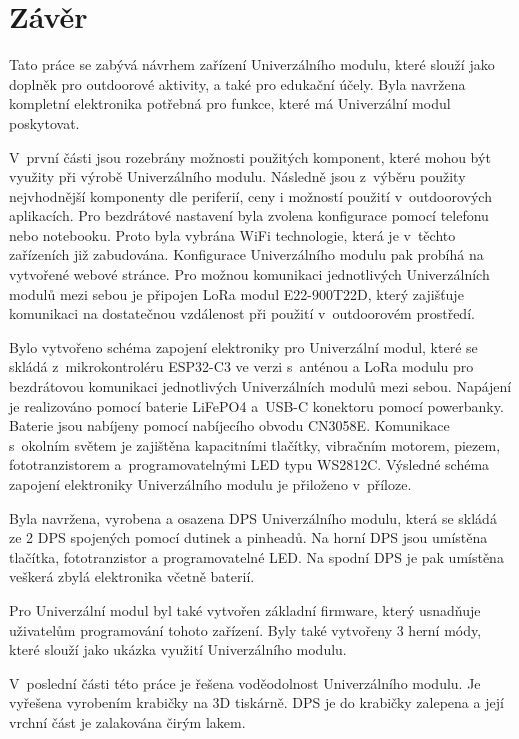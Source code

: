 \chapter*{Závěr}
{}
Tato práce se zabývá návrhem zařízení Univerzálního modulu, které slouží jako doplněk pro outdoorové aktivity, a také pro edukační účely. Byla navržena kompletní 
elektronika potřebná pro funkce, které má Univerzální modul poskytovat. 

V~první části jsou rozebrány možnosti použitých komponent, které mohou být využity při výrobě Univerzálního modulu. Následně jsou z~výběru použity 
nejvhodnější komponenty dle periferií, ceny i možností použití v~outdoorových aplikacích. Pro bezdrátové nastavení byla zvolena konfigurace pomocí telefonu nebo 
notebooku. Proto byla vybrána WiFi technologie, která je v~těchto zařízeních již zabudována. Konfigurace Univerzálního modulu pak probíhá na vytvořené webové stránce. 
Pro možnou komunikaci jednotlivých Univerzálních modulů mezi sebou je připojen LoRa modul E22-900T22D, který zajišťuje komunikaci na dostatečnou vzdálenost při použití 
v~outdoorovém prostředí. 

Bylo vytvořeno schéma zapojení elektroniky pro Univerzální modul, které se skládá z~mikrokontroléru ESP32-C3 ve verzi s~anténou a LoRa modulu pro 
bezdrátovou komunikaci jednotlivých Univerzálních modulů mezi sebou. Napájení je realizováno pomocí baterie LiFePO4 a~USB-C konektoru pomocí powerbanky. Baterie 
jsou nabíjeny pomocí nabíjecího obvodu CN3058E. Komunikace s~okolním světem je zajištěna kapacitními tlačítky, 
vibračním motorem, piezem, fototranzistorem a~programovatelnými LED typu WS2812C. Výsledné schéma zapojení elektroniky Univerzálního modulu je přiloženo v~příloze. 

Byla navržena, vyrobena a osazena DPS Univerzálního modulu, která se skládá ze 2 DPS spojených pomocí dutinek a pinheadů. Na horní DPS jsou umístěna tlačítka, fototranzistor 
a programovatelné LED. Na spodní DPS je pak umístěna veškerá zbylá elektronika včetně baterií. 

Pro Univerzální modul byl také vytvořen základní firmware, který usnadňuje uživatelům programování tohoto zařízení. Byly také vytvořeny 3 herní módy, které slouží jako ukázka 
využití Univerzálního modulu. 

V~poslední části této práce je řešena voděodolnost Univerzálního modulu. Je vyřešena vyrobením krabičky na 3D tiskárně. DPS je do krabičky zalepena a její vrchní část je zalakována čirým
lakem. 
